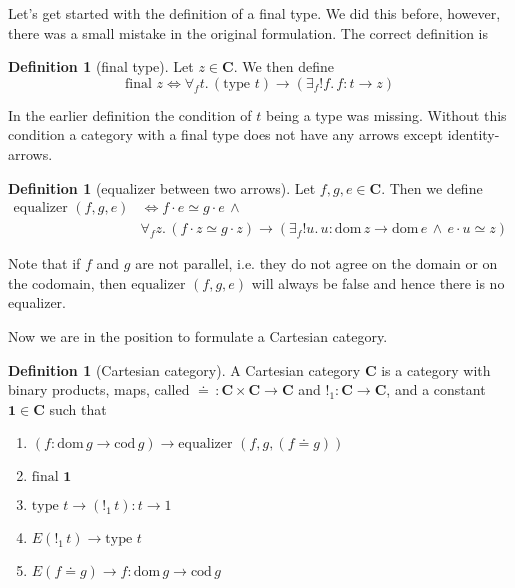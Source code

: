 \documentclass[a4paper, 11pt]{article}
\theoremstyle{definition}
\newtheorem{definition}[theorem]{Definition}
\newcommand{\cat}{%
	\mathbf %
}
\newcommand{\domain}[ 1 ]{%
	\mathrm{dom} \, #1 %
}
\newcommand{\codomain}[ 1 ]{%
	\mathrm{cod} \, #1%
}
\newcommand{\notion}[1]{\text{#1 }}
\begin{document}
Let's get started with the definition of a final type. We did this before, however, there was a small mistake in the original formulation. The correct definition is

\begin{definition}[final type] 
	Let $z \in \cat C$. We then define
	\[ \notion{final} z \Longleftrightarrow \forall_f t. \, (\notion{type} t) \longrightarrow (\exists_f!f. \, f:t\rightarrow z)\]
\end{definition} 

In the earlier definition the condition of $t$ being a type was missing. Without this condition a category with a final type does not have any arrows except identity-arrows.

\begin{definition}[equalizer between two arrows]
	Let $f, g, e \in \cat C$. Then we define 
	\begin{align*}
		\notion{equalizer}(f, g, e) & \Longleftrightarrow f \cdot e \simeq g \cdot e \, \wedge \\
		& \forall_f z. \, (f \cdot z \simeq g \cdot z) \longrightarrow (\exists_f!u. \, u:\domain{z}\rightarrow\domain{e} \, \wedge \, e \cdot u \simeq z)
	\end{align*}
\end{definition}

Note that if $f$ and $g$ are not parallel, i.e. they do not agree on the domain or on the codomain, then $\notion{equalizer}(f,g,e)$ will always be false and hence there is no equalizer.

Now we are in the position to formulate a Cartesian category.

\begin{definition}[Cartesian category]
	A Cartesian category $ \cat C$ is a category with binary products, maps, called $\doteq \, :\cat C \times \cat C \to \cat C$ and $!_1:\cat C \to \cat C$, and a constant $\boldsymbol{1} \in \cat C$ such that
	\begin{enumerate}
		\item $(f:\domain{g} \rightarrow \codomain{g}) \longrightarrow \notion{equalizer}(f, g, (f \doteq g))$
		\item $\notion{final} \boldsymbol{1}$
		\item $\notion{type} t \longrightarrow (!_1 \, t):t\rightarrow1$
		\item $E (!_1 \, t) \longrightarrow \notion{type} t$
		\item $E (f \doteq g) \longrightarrow f:\domain{g} \rightarrow \codomain{g}$
	\end{enumerate}
\end{definition}
\end{document}
